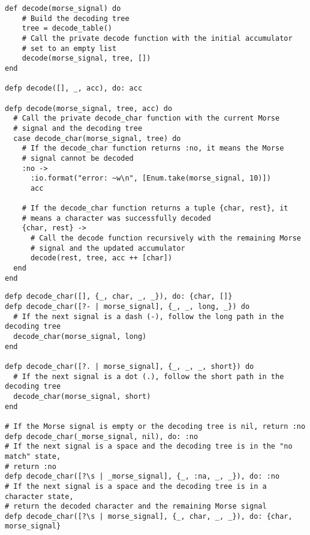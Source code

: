 \documentclass[a4paper,11pt]{article}
\newenvironment{code}{\captionsetup{type=listing}}{}
\begin{document}
\begin{code}
\label{code:decode}
\begin{verbatim}
def decode(morse_signal) do
    # Build the decoding tree
    tree = decode_table()
    # Call the private decode function with the initial accumulator 
    # set to an empty list
    decode(morse_signal, tree, [])
end

defp decode([], _, acc), do: acc

defp decode(morse_signal, tree, acc) do
  # Call the private decode_char function with the current Morse 
  # signal and the decoding tree
  case decode_char(morse_signal, tree) do
    # If the decode_char function returns :no, it means the Morse 
    # signal cannot be decoded
    :no ->
      :io.format("error: ~w\n", [Enum.take(morse_signal, 10)])
      acc

    # If the decode_char function returns a tuple {char, rest}, it 
    # means a character was successfully decoded
    {char, rest} ->
      # Call the decode function recursively with the remaining Morse 
      # signal and the updated accumulator
      decode(rest, tree, acc ++ [char])
  end
end
\end{verbatim}
\end{code}
\begin{code}
\label{code:decodeChar}
\begin{verbatim}
defp decode_char([], {_, char, _, _}), do: {char, []}
defp decode_char([?- | morse_signal], {_, _, long, _}) do
  # If the next signal is a dash (-), follow the long path in the decoding tree
  decode_char(morse_signal, long)
end

defp decode_char([?. | morse_signal], {_, _, _, short}) do
  # If the next signal is a dot (.), follow the short path in the decoding tree
  decode_char(morse_signal, short)
end

# If the Morse signal is empty or the decoding tree is nil, return :no
defp decode_char(_morse_signal, nil), do: :no
# If the next signal is a space and the decoding tree is in the "no match" state, 
# return :no
defp decode_char([?\s | _morse_signal], {_, :na, _, _}), do: :no
# If the next signal is a space and the decoding tree is in a character state, 
# return the decoded character and the remaining Morse signal
defp decode_char([?\s | morse_signal], {_, char, _, _}), do: {char, morse_signal}
\end{verbatim}
\end{code}
\end{document}
